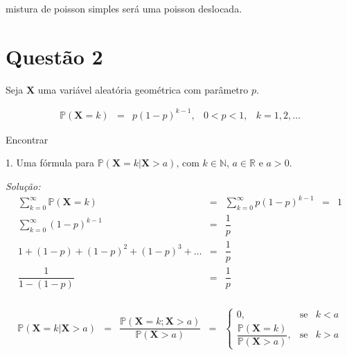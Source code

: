 \documentclass[a4paper, 11pt]{article}
\begin{document}
\noindent
mistura de poisson simples será uma poisson deslocada.

\section*{Questão 2} 

Seja $\mathbf{X}$ uma variável aleatória geométrica com parâmetro $p$.

\begin{equation*}
\begin{array}{lclll}
\mathds{P}(\mathbf{X} = k) & = & p(1-p)^{k-1}, & 0<p<1, & k=1,2,\ldots
\end{array}
\end{equation*}

\noindent
Encontrar

1. Uma fórmula para $\mathds{P}(\mathbf{X} = k|\mathbf{X}>a)$, com $k \in \mathds{N}$, $a\in \mathds{R}$ e $a>0$.

\noindent
\textit{Solução:} \\
\begin{equation*}
\begin{array}{rclll}
\displaystyle\sum_{k=0}^{\infty}\mathds{P}(\mathbf{X} = k) & = & \displaystyle\sum_{k=0}^{\infty}p(1-p)^{k-1} & = & 1 \\[15pt]

\displaystyle\sum_{k=0}^{\infty}(1-p)^{k-1} & = & \dfrac{1}{p} \\[15pt]

1 + (1-p) + (1-p)^{2} + (1-p)^{3} + \ldots & = & \dfrac{1}{p} \\[15pt]

\dfrac{1}{1-(1-p)} & = & \dfrac{1}{p} \\[15pt]

\end{array}
\end{equation*}

\begin{equation*}
\begin{array}{rclll}
\mathds{P}(\mathbf{X} = k|\mathbf{X}>a) & = & \dfrac{\mathds{P}(\mathbf{X} = k;\mathbf{X}>a)}{\mathds{P}(\mathbf{X}>a)} & = & \left\{
    \begin{array}{rrlc}
         0, & \mbox{se} & k < a \\
         \dfrac{\mathds{P}(\mathbf{X} = k)}{\mathds{P}(\mathbf{X}>a)}, & \mbox{se} & k>a
    \end{array}
\right.\\[15pt]

\end{array}
\end{equation*}
\end{document}
